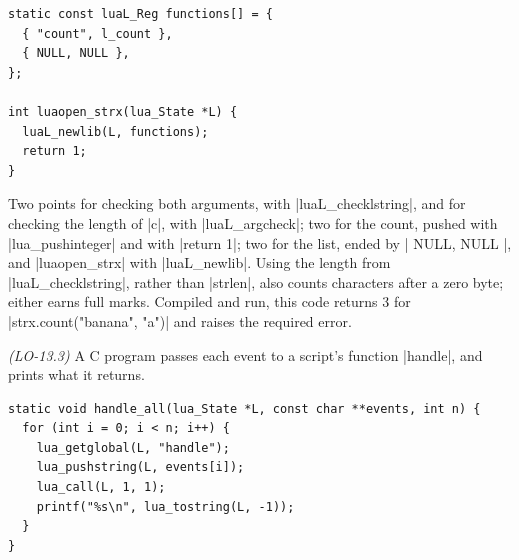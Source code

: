\documentclass[11pt,addpoints]{exam}
\begin{document}
\begin{questions}
\begin{solutionorbox}[3.6in]
\begin{lstlisting}[style=c]
static const luaL_Reg functions[] = {
  { "count", l_count },
  { NULL, NULL },
};

int luaopen_strx(lua_State *L) {
  luaL_newlib(L, functions);
  return 1;
}
\end{lstlisting}
  Two points for checking both arguments, with \code|luaL_checklstring|, and for checking the
  length of \code|c|, with \code|luaL_argcheck|; two for the count, pushed with \code|lua_pushinteger| and with
  \code|return 1|; two for the list, ended by \code|{ NULL, NULL }|, and \code|luaopen_strx| with
  \code|luaL_newlib|. Using the length from \code|luaL_checklstring|, rather than
  \code|strlen|, also counts characters after a zero byte; either earns full marks. Compiled and
  run, this code returns 3 for \code|strx.count("banana", "a")| and raises the required error.
\end{solutionorbox}

\question \textit{(LO-13.3)} A C program passes each event to a script's function
\code|handle|, and prints what it returns.

\begin{lstlisting}[style=c]
static void handle_all(lua_State *L, const char **events, int n) {
  for (int i = 0; i < n; i++) {
    lua_getglobal(L, "handle");
    lua_pushstring(L, events[i]);
    lua_call(L, 1, 1);
    printf("%s\n", lua_tostring(L, -1));
  }
}
\end{lstlisting}

\end{questions}
\end{document}
